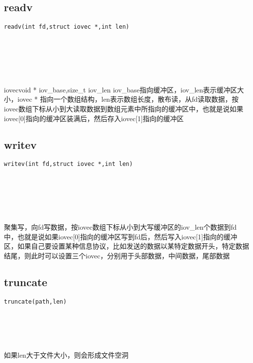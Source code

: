 \documentclass[10pt,a4paper]{article}
\begin{document}
\subsection{readv}
\begin{spacing}{2.0}
\lstset{language=C,numbers=none}
\begin{lstlisting}
readv(int fd,struct iovec *,int len)
\end{lstlisting}
{\large\color[rgb]{0.2,0.4,0.6}{fd:}} \\
{\large\color[rgb]{0.2,0.4,0.6}{*:}} \\
{\large\color[rgb]{0.2,0.4,0.6}{len:}}
\paragraph{ \ \ }iovec{void * iov\_base,size\_t iov\_len} iov\_base指向缓冲区，iov\_len表示缓冲区大小，iovec * 指向一个数组结构，len表示数组长度，散布读，从fd读取数据，按iovec数组下标从小到大读取数据到数组元素中所指向的缓冲区中，也就是说如果iovec[0]指向的缓冲区装满后，然后存入iovec[1]指向的缓冲区
\end{spacing}

\subsection{writev}
\begin{spacing}{2.0}
\lstset{language=C,numbers=none}
\begin{lstlisting}
writev(int fd,struct iovec *,int len)
\end{lstlisting}
{\large\color[rgb]{0.2,0.4,0.6}{fd:}} \\
{\large\color[rgb]{0.2,0.4,0.6}{*:}} \\
{\large\color[rgb]{0.2,0.4,0.6}{len:}}
\paragraph{ \ \ }聚集写，向fd写数据，按iovec数组下标从小到大写缓冲区的iov\_len个数据到fd中，也就是说如果iovec[0]指向的缓冲区写到fd后，然后写入iovec[1]指向的缓冲区，如果自己要设置某种信息协议，比如发送的数据以某特定数据开头，特定数据结尾，则此时可以设置三个iovec，分别用于头部数据，中间数据，尾部数据
\end{spacing}

\subsection{truncate}
\begin{spacing}{2.0}
\lstset{language=C,numbers=none}
\begin{lstlisting}
truncate(path,len)
\end{lstlisting}
{\large\color[rgb]{0.2,0.4,0.6}{path:}} \\
{\large\color[rgb]{0.2,0.4,0.6}{len:}}
\paragraph{ \ \ }如果len大于文件大小，则会形成文件空洞
\end{spacing}
\end{document}
